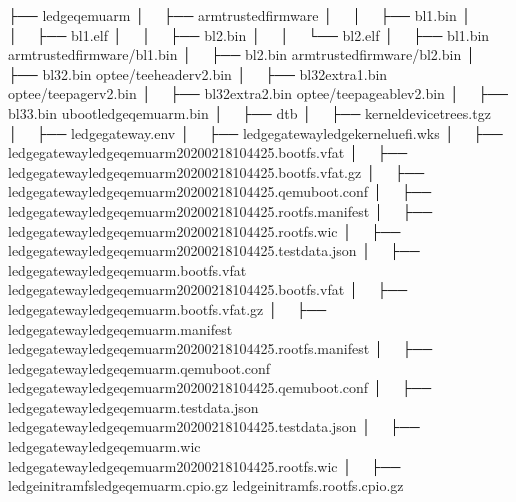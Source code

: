 \documentclass[a4paper,10pt,oneside,english]{sphinxmanual}
\begin{document}
\begin{sphinxVerbatim}[commandchars=\\\{\}]
├── ledge\PYGZhy{}qemuarm
│   ├── arm\PYGZhy{}trusted\PYGZhy{}firmware
│   │   ├── bl1.bin
│   │   ├── bl1.elf
│   │   ├── bl2.bin
│   │   └── bl2.elf
│   ├── bl1.bin \PYGZhy{}\PYGZgt{} arm\PYGZhy{}trusted\PYGZhy{}firmware/bl1.bin
│   ├── bl2.bin \PYGZhy{}\PYGZgt{} arm\PYGZhy{}trusted\PYGZhy{}firmware/bl2.bin
│   ├── bl32.bin \PYGZhy{}\PYGZgt{} optee/tee\PYGZhy{}header\PYGZus{}v2.bin
│   ├── bl32\PYGZus{}extra1.bin \PYGZhy{}\PYGZgt{} optee/tee\PYGZhy{}pager\PYGZus{}v2.bin
│   ├── bl32\PYGZus{}extra2.bin \PYGZhy{}\PYGZgt{} optee/tee\PYGZhy{}pageable\PYGZus{}v2.bin
│   ├── bl33.bin \PYGZhy{}\PYGZgt{} u\PYGZhy{}boot\PYGZhy{}ledge\PYGZhy{}qemuarm.bin
│   ├── dtb
│   ├── kernel\PYGZhy{}devicetrees.tgz
│   ├── ledge\PYGZhy{}gateway.env
│   ├── ledge\PYGZhy{}gateway\PYGZhy{}ledge\PYGZhy{}kernel\PYGZhy{}uefi.wks
│   ├── ledge\PYGZhy{}gateway\PYGZhy{}ledge\PYGZhy{}qemuarm\PYGZhy{}20200218104425.bootfs.vfat
│   ├── ledge\PYGZhy{}gateway\PYGZhy{}ledge\PYGZhy{}qemuarm\PYGZhy{}20200218104425.bootfs.vfat.gz
│   ├── ledge\PYGZhy{}gateway\PYGZhy{}ledge\PYGZhy{}qemuarm\PYGZhy{}20200218104425.qemuboot.conf
│   ├── ledge\PYGZhy{}gateway\PYGZhy{}ledge\PYGZhy{}qemuarm\PYGZhy{}20200218104425.rootfs.manifest
│   ├── ledge\PYGZhy{}gateway\PYGZhy{}ledge\PYGZhy{}qemuarm\PYGZhy{}20200218104425.rootfs.wic
│   ├── ledge\PYGZhy{}gateway\PYGZhy{}ledge\PYGZhy{}qemuarm\PYGZhy{}20200218104425.testdata.json
│   ├── ledge\PYGZhy{}gateway\PYGZhy{}ledge\PYGZhy{}qemuarm.bootfs.vfat \PYGZhy{}\PYGZgt{} ledge\PYGZhy{}gateway\PYGZhy{}ledge\PYGZhy{}qemuarm\PYGZhy{}20200218104425.bootfs.vfat
│   ├── ledge\PYGZhy{}gateway\PYGZhy{}ledge\PYGZhy{}qemuarm.bootfs.vfat.gz
│   ├── ledge\PYGZhy{}gateway\PYGZhy{}ledge\PYGZhy{}qemuarm.manifest \PYGZhy{}\PYGZgt{} ledge\PYGZhy{}gateway\PYGZhy{}ledge\PYGZhy{}qemuarm\PYGZhy{}20200218104425.rootfs.manifest
│   ├── ledge\PYGZhy{}gateway\PYGZhy{}ledge\PYGZhy{}qemuarm.qemuboot.conf \PYGZhy{}\PYGZgt{} ledge\PYGZhy{}gateway\PYGZhy{}ledge\PYGZhy{}qemuarm\PYGZhy{}20200218104425.qemuboot.conf
│   ├── ledge\PYGZhy{}gateway\PYGZhy{}ledge\PYGZhy{}qemuarm.testdata.json \PYGZhy{}\PYGZgt{} ledge\PYGZhy{}gateway\PYGZhy{}ledge\PYGZhy{}qemuarm\PYGZhy{}20200218104425.testdata.json
│   ├── ledge\PYGZhy{}gateway\PYGZhy{}ledge\PYGZhy{}qemuarm.wic \PYGZhy{}\PYGZgt{} ledge\PYGZhy{}gateway\PYGZhy{}ledge\PYGZhy{}qemuarm\PYGZhy{}20200218104425.rootfs.wic
│   ├── ledge\PYGZhy{}initramfs\PYGZhy{}ledge\PYGZhy{}qemuarm.cpio.gz \PYGZhy{}\PYGZgt{} ledge\PYGZhy{}initramfs.rootfs.cpio.gz

\end{sphinxVerbatim}
\end{document}
